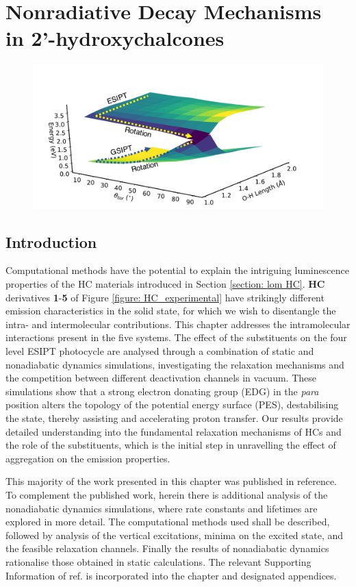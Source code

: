 \chapter[Nonradiative Decay Mechanisms in 2'-hydroxychalcones]{Nonradiative Decay Mechanisms\\ in 2'-hydroxychalcones}
\label{chapter:NRdecay}
\begin{figure}[H]
\centering
  \includegraphics[width=0.7\linewidth]{3nonradiativedecay/1toc.pdf}
\end{figure}
\section{Introduction}\label{section: NRdecay_intro}
Computational methods have the potential to explain the intriguing luminescence properties of the \acf{HC} materials introduced in Section \ref{section: lom HC}. \textbf{HC} derivatives \textbf{1}-\textbf{5} of Figure \ref{figure: HC_experimental} have strikingly different emission characteristics in the solid state, for which we wish to disentangle the intra- and intermolecular contributions. This chapter addresses the intramolecular interactions present in the five systems. The effect of the substituents on the four level \ac{ESIPT} photocycle are analysed through a combination of static and nonadiabatic dynamics simulations, investigating the relaxation mechanisms and the competition between different deactivation channels in vacuum. These simulations show that a strong electron donating group (EDG) in the \textit{para} position alters the topology of the potential energy surface (PES), destabilising the \Estar{} state, thereby assisting and accelerating proton transfer. Our results provide detailed understanding into the fundamental relaxation mechanisms of \ac{HC}s and the role of the substituents, which is the initial step in unravelling the effect of aggregation on the emission properties.

This majority of the work presented in this chapter was published in reference. To complement the published work, herein there is additional analysis of the nonadiabatic dynamics simulations, where rate constants and lifetimes are explored in more detail. The computational methods used shall be described, followed by analysis of the vertical excitations, minima on the excited state, and the feasible relaxation channels. Finally the results of nonadiabatic dynamics rationalise those obtained in static calculations. The relevant Supporting Information of ref. is incorporated into the chapter and designated appendices.

